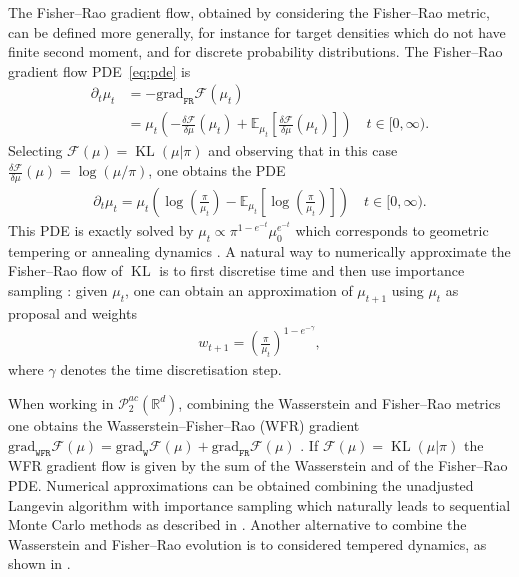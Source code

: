 \documentclass{article}
\newcommand{\KL}{\mathop{\mathrm{KL}}\nolimits}
\newcommand{\cF}{\mathcal F}
\newcommand{\R}{\mathbb R}
\newcommand{\grad}{\textrm {grad}}
\begin{document}
The Fisher--Rao gradient flow, obtained by considering the Fisher--Rao metric, can be defined more generally, for instance for target densities which do not have finite second moment, and for discrete probability distributions.
The Fisher--Rao gradient flow PDE~\eqref{eq:pde} is \citep{carrillo_fisher-rao_2024}
 \begin{align*}
        \partial_t \mu_t &=-\grad_{\mathtt{FR}}\cF(\mu_t)\\
        &= \mu_t \left( -\frac{\delta \cF}{\delta \mu}(\mu_t)+ \mathbb{E}_{\mu_t} \left[  \frac{\delta \cF}{\delta \mu}(\mu_t)\right] \right) \quad t \in [0,\infty).
\end{align*}
Selecting $\cF(\mu)=\KL(\mu|\pi)$ and observing that in this case $\frac{\delta \cF}{\delta \mu}(\mu) = \log (\mu/\pi)$, one obtains the PDE
 \begin{align*}
        \partial_t \mu_t = \mu_t \left( \log \left( \frac{\pi}{\mu_t} \right) - \mathbb{E}_{\mu_t} \left[  \log \left( \frac{\pi}{\mu_t} \right) \right] \right) \quad t \in [0,\infty).
\end{align*} 
This PDE is exactly solved by $\mu_t \propto \pi^{1 - e^{-t}} \mu_0^{e^{-t}}$ \cite[Theorem 4.1]{chen2023sampling} which corresponds to geometric tempering or annealing dynamics \citep{domingo-enrich2023an, chopin2023connection}.
A natural way to numerically approximate the Fisher--Rao flow of $\KL$ is to first discretise time and then use importance sampling \citep{crucinio2025, korba2022adaptive}: given $\mu_t$, one can obtain an approximation of $\mu_{t+1}$ using $\mu_t$ as proposal and weights 
\begin{align*}
    w_{t+1} = \left( \frac{\pi}{\mu_t} \right)^{1-e^{-\gamma}},
\end{align*}
where $\gamma$ denotes the time discretisation step.

When working in $\mathcal{P}_2^{ac}(\R^d)$, combining the Wasserstein and Fisher--Rao metrics one obtains the Wasserstein--Fisher--Rao (WFR) gradient $\grad_{\mathtt{WFR}} \cF(\mu) = \grad_{\mathtt{W}} \cF(\mu)+\grad_{\mathtt{FR}} \cF(\mu)$ \citep{gallouet2017jko}. If $\cF(\mu)=\KL(\mu|\pi)$ the WFR gradient flow is given by the sum of the Wasserstein and of the Fisher--Rao PDE. Numerical approximations can be obtained combining the unadjusted Langevin algorithm with importance sampling which naturally leads to sequential Monte Carlo methods \citep{del2006sequential} as described in \cite{crucinio2025}. Another alternative to combine the Wasserstein and Fisher--Rao evolution is to considered tempered dynamics, as shown in \cite{Chehab2024, crucinio2026properties}.
\end{document}
